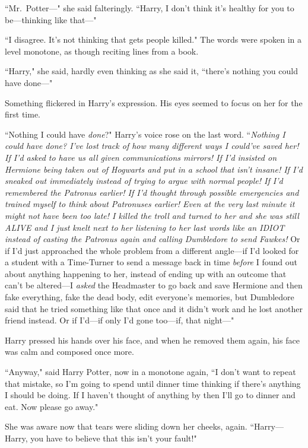 ``Mr.~Potter—" she said falteringly. ``Harry, I don't think it's healthy for you to be—thinking like that—"

``I disagree. It's not thinking that gets people killed." The words were spoken in a level monotone, as though reciting lines from a book.

``Harry," she said, hardly even thinking as she said it, ``there's nothing you could have done—"

Something flickered in Harry's expression. His eyes seemed to focus on her for the first time.

``Nothing I could have \emph{done}?" Harry's voice rose on the last word. ``\emph{Nothing I could have \emph{done}? I've lost track of how many different ways I could've saved her! If I'd asked to have us all given communications mirrors! If I'd insisted on Hermione being taken out of Hogwarts and put in a school that isn't insane! If I'd sneaked out immediately instead of trying to argue with normal people! If I'd remembered the Patronus earlier! If I'd thought through possible emergencies and trained myself to think about Patronuses earlier! Even at the very last minute it might not have been too late! I killed the troll and turned to her and she was still ALIVE and I just knelt next to her listening to her last words like an IDIOT instead of casting the Patronus again and calling Dumbledore to send Fawkes!} Or if I'd just approached the whole problem from a different angle—if I'd looked for a student with a Time-Turner to send a message back in time \emph{before} I found out about anything happening to her, instead of ending up with an outcome that can't be altered—I \emph{asked} the Headmaster to go back and save Hermione and then fake everything, fake the dead body, edit everyone's memories, but Dumbledore said that he tried something like that once and it didn't work and he lost another friend instead. Or if I'd—if only I'd gone too—if, that night—"

Harry pressed his hands over his face, and when he removed them again, his face was calm and composed once more.

``Anyway," said Harry Potter, now in a monotone again, ``I don't want to repeat that mistake, so I'm going to spend until dinner time thinking if there's anything I should be doing. If I haven't thought of anything by then I'll go to dinner and eat. Now please go away."

She was aware now that tears were sliding down her cheeks, again. ``Harry—Harry, you have to believe that this isn't your fault!"

